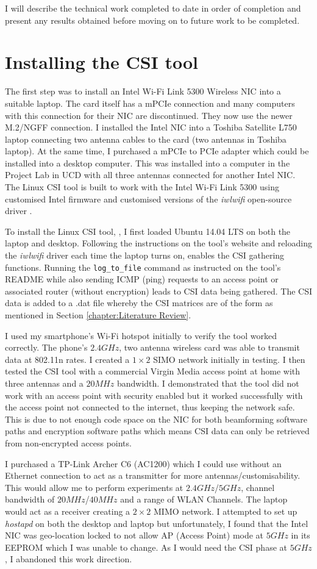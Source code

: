 I will describe the technical work completed to date in order of completion and present any results obtained before moving on to future work to be completed. 
\section{Installing the CSI tool}
The first step was to install an Intel Wi-Fi Link 5300 Wireless NIC into a suitable laptop. The card itself has a mPCIe connection and many computers with this connection for their NIC are discontinued. They now use the newer M.2/NGFF connection. I installed the Intel NIC into a Toshiba Satellite L750 laptop connecting two antenna cables to the card (two antennas in Toshiba laptop). At the same time, I purchased a mPCIe to PCIe adapter which could be installed into a desktop computer. This was installed into a computer in the Project Lab in UCD with all three antennas connected for another Intel NIC. The Linux CSI tool is built to work with the Intel Wi-Fi Link 5300 using customised Intel firmware and customised versions of the \textit{iwlwifi} open-source driver \citep{Halperin_csitool}. \par
To install the Linux CSI tool, \cite{Halperin_csitool}, I first loaded Ubuntu 14.04 LTS on both the laptop and desktop. 
Following the instructions on the tool's website and reloading the \textit{iwlwifi} driver each time the laptop turns on, enables the CSI gathering functions. Running the \lstinline{log_to_file} command as instructed on the tool's README while also sending ICMP (ping) requests to an access point or associated router (without encryption) leads to CSI data being gathered. The CSI data is added to a .dat file whereby the CSI matrices are of the form as mentioned in Section \ref{chapter:Literature Review}. \par
I used my smartphone's Wi-Fi hotspot initially to verify the tool worked correctly. The phone's $2.4GHz$, two antenna wireless card was able to transmit data at 802.11n rates. I created a $1\times 2$ SIMO network initially in testing. I then tested the CSI tool with a commercial Virgin Media access point at home with three antennas and a $20MHz$ bandwidth. I demonstrated that the tool did not work with an access point with security enabled but it worked successfully with the access point not connected to the internet, thus keeping the network safe. This is due to not enough code space on the NIC for both beamforming software paths and encryption software paths which means CSI data can only be retrieved from non-encrypted access points.  \par
I purchased a TP-Link Archer C6 (AC1200) which I could use without an Ethernet connection to act as a transmitter for more antennas/customisability. This would allow me to perform experiments at $2.4GHz$/$5GHz$, channel bandwidth of $20MHz$/$40MHz$ and a range of WLAN Channels. The laptop would act as a receiver creating a $2\times 2$ MIMO network. I attempted to set up \textit{hostapd} on both the desktop and laptop but unfortunately, I found that the Intel NIC was geo-location locked to not allow AP (Access Point) mode at $5GHz$ in its EEPROM which I was unable to change. As I would need the CSI phase at $5GHz$, I abandoned this work direction. 
